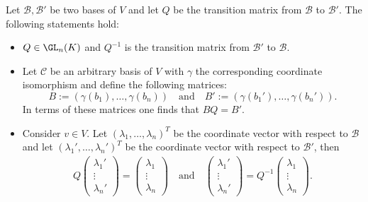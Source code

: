     \begin{property}\label{linalgebra:transition_matrix_properties}
        Let $\mathcal{B},\mathcal{B}'$ be two bases of $V$ and let $Q$ be the transition matrix from $\mathcal{B}$ to $\mathcal{B}'$. The following statements hold:
        \begin{itemize}
            \item $Q\in\GL_n(K)$ and $Q^{-1}$ is the transition matrix from $\mathcal{B}'$ to $\mathcal{B}$.
            \item Let $\mathcal{C}$ be an arbitrary basis of $V$ with $\gamma$ the corresponding coordinate isomorphism and define the following matrices: \[B:=(\gamma(b_1),\ldots,\gamma(b_n)) \quad\text{and}\quad B':=(\gamma(b_1'),\ldots,\gamma(b_n')).\] In terms of these matrices one finds that $BQ = B'$.
            \item Consider $v\in V$. Let $(\lambda_1,\ldots,\lambda_n)^T$ be the coordinate vector with respect to $\mathcal{B}$ and let $(\lambda_1',\ldots,\lambda_n')^T$ be the coordinate vector with respect to $\mathcal{B}'$, then
                \begin{gather}
                    Q
                    \begin{pmatrix}
                        \lambda_1'\\\vdots\\\lambda_n'
                    \end{pmatrix}
                    =
                    \begin{pmatrix}
                        \lambda_1\\\vdots\\\lambda_n
                    \end{pmatrix}
                    \quad\text{and}\quad
                    \begin{pmatrix}
                        \lambda_1'\\\vdots\\\lambda_n'
                    \end{pmatrix}
                    = Q^{-1}
                    \begin{pmatrix}
                        \lambda_1\\\vdots\\\lambda_n
                    \end{pmatrix}.
                \end{gather}
        \end{itemize}
    \end{property}
